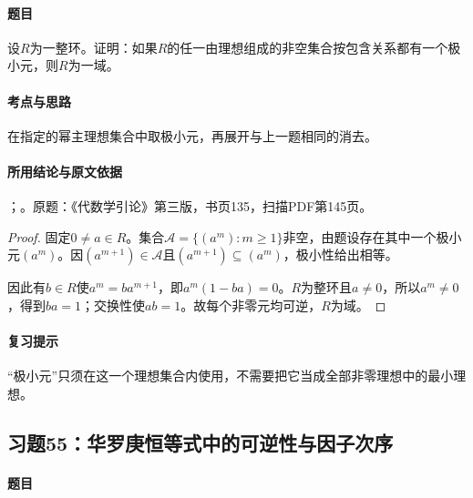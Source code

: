 \label{ex:3:54}

\paragraph{题目}

设$R$为一整环。证明：如果$R$的任一由理想组成的非空集合按包含关系都有一个极小元，则$R$为一域。

\paragraph{考点与思路}

在指定的幂主理想集合中取极小元，再展开与上一题相同的消去。

\paragraph{所用结论与原文依据}

；。原题：《代数学引论》第三版，书页135，扫描PDF第145页。


\begin{proof}

固定$0\ne a\in R$。集合$\mathcal A=\{(a^m):m\ge1\}$非空，由题设存在其中一个极小元$(a^m)$。因$(a^{m+1})\in\mathcal A$且$(a^{m+1})\subseteq(a^m)$，极小性给出相等。

因此有$b\in R$使$a^m=ba^{m+1}$，即$a^m(1-ba)=0$。$R$为整环且$a\ne0$，所以$a^m\ne0$，得到$ba=1$；交换性使$ab=1$。故每个非零元均可逆，$R$为域。

\end{proof}

\paragraph{复习提示}

“极小元”只须在这一个理想集合内使用，不需要把它当成全部非零理想中的最小理想。



\subsection{习题55：华罗庚恒等式中的可逆性与因子次序}

\label{ex:3:55}

\paragraph{题目}

